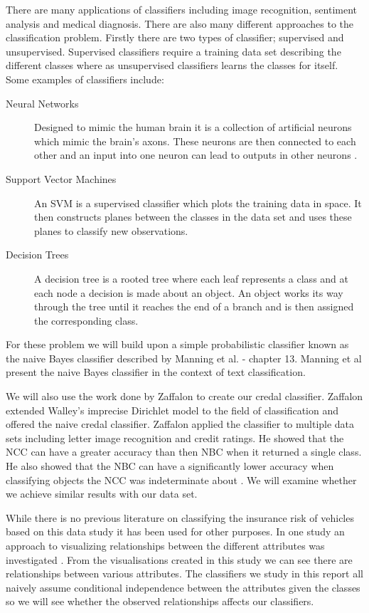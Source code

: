 There are many applications of classifiers including image recognition, sentiment analysis and medical diagnosis.
There are also many different approaches to the classification problem.
Firstly there are two types of classifier; supervised and unsupervised.
Supervised classifiers require a training data set describing the different classes where as unsupervised classifiers learns the classes for itself.
Some examples of classifiers include:
\begin{description}
	\item[Neural Networks] Designed to mimic the human brain it is a collection of artificial neurons which mimic the brain's axons. These neurons are then connected to each other and an input into one neuron can lead to outputs in other neurons \cite{Michie94}.
	\item[Support Vector Machines] An SVM is a supervised classifier which plots the training data in space. It then constructs planes between the classes in the data set and uses these planes to classify new observations.
	\item[Decision Trees] A decision tree is a rooted tree where each leaf represents a class and at each node a decision is made about an object. An object works its way through the tree until it reaches the end of a branch and is then assigned the corresponding class. 
\end{description}

For these problem we will build upon a simple probabilistic classifier known as the naive Bayes classifier described by Manning et al. \cite{Manning08} - chapter 13.
Manning et al present the naive Bayes classifier in the context of text classification.

We will also use the work done by Zaffalon \cite{Zaffalon01} to create our credal classifier.
Zaffalon extended Walley's imprecise Dirichlet model \cite{Walley96} to the field of classification and offered the naive credal classifier.
Zaffalon applied the classifier to multiple data sets including letter image recognition and credit ratings.
He showed that the NCC can have a greater accuracy than then NBC when it returned a single class.
He also showed that the NBC can have a significantly lower accuracy when classifying objects the NCC was indeterminate about \cite{Zaffalon01}.
We will examine whether we achieve similar results with our data set.

While there is no previous literature on classifying the insurance risk of vehicles based on this data study it has been used for other purposes.
In one study an approach to visualizing relationships between the different attributes was investigated \cite{Rosario04}.
From the visualisations created in this study we can see there are relationships between various attributes.
The classifiers we study in this report all naively assume conditional independence between the attributes given the classes so we will see whether the observed relationships affects our classifiers.

